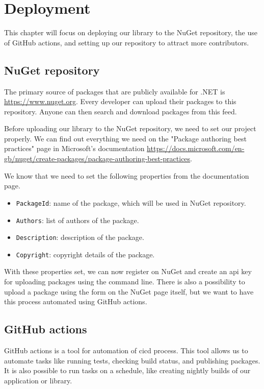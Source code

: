 \chapter {Deployment}

This chapter will focus on deploying our library to the NuGet repository, the use of GitHub actions, and setting up our repository to attract more contributors.

\section {NuGet repository}

The primary source of packages that are publicly available for .NET is \url{https://www.nuget.org}. Every developer can
upload their packages to this repository. Anyone can then search and download packages from this feed.

Before uploading our library to the NuGet repository, we need to set our project properly. We can find out
everything we need on the "Package authoring best practices" page in Microsoft's documentation
\url{https://docs.microsoft.com/en-gb/nuget/create-packages/package-authoring-best-practices}.

We know that we need to set the following properties from the documentation page.

\begin{itemize}
    \item \texttt{PackageId}: name of the package, which will be used in NuGet repository.
    \item \texttt{Authors}: list of authors of the package.
    \item \texttt{Description}: description of the package.
    \item \texttt{Copyright}: copyright details of the package.
\end{itemize}

With these properties set, we can now register on NuGet and create an \acrshort{api} key for uploading packages
using the command line. There is also a possibility to upload a package using the form on the NuGet page itself, but we want to
have this process automated using GitHub actions.

\section{GitHub actions}

GitHub actions is a tool for automation of \acrfull{cicd} process. This tool allows us to automate tasks like
running tests, checking build status, and publishing packages. It is also possible to run tasks on a schedule, like creating nightly
builds of our application or library.

